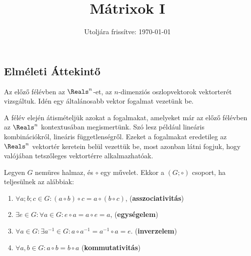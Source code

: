 \documentclass[a4paper, 12pt]{scrartcl}
\title{Mátrixok I}
\date{Utoljára frissítve: \today}
\begin{document}
\maketitle

\subsection{Elméleti Áttekintő}

\begin{blueBox}
  Az előző félévben az $\Reals^n$-et, az $n$-dimenziós oszlopvektorok
  vektorterét vizsgáltuk. Idén egy általánosabb vektor fogalmat vezetünk be.

  A félév elején átismételjük azokat a fogalmakat, amelyeket már az előző
  félévben az $\Reals^n$ kontextusában megismertünk. Szó lesz például lineáris
  kombinációkról, lineáris függetlenségről. Ezeket a fogalmakat eredetileg az
  $\Reals^n$ vektortér keretein belül vezettük be, most azonban látni fogjuk,
  hogy valójában tetszőleges vektortérre alkalmazhatóak.
\end{blueBox}

\begin{definition}
  Legyen $G$ nemüres halmaz, és $\circ$ egy művelet. Ekkor a $(G; \circ)$ csoport,
  ha teljesülnek az alábbiak:
  \begin{enumerate}
    \item $\forall a; b; c \in G: (a \circ b) \circ c = a \circ (b \circ c)$,
          \hfill (\textbf{asszociativitás})

    \item $\exists e \in G: \forall a \in G: e \circ a = a \circ e = a$,
          \hfill(\textbf{egységelem})

    \item $\forall a \in G: \exists a^{-1} \in G:
            a \circ a^{-1} = a^{-1} \circ a = e$.
          \hfill (\textbf{inverzelem})

    \item $\forall a, b \in G:
            a \circ b = b \circ a$
          \hfill (\textbf{kommutativitás})
  \end{enumerate}
\end{definition}
\end{document}
